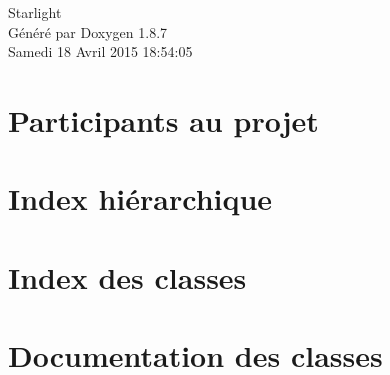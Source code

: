 \documentclass[twoside]{book}
\newcommand{\+}{\discretionary{\mbox{\scriptsize$\hookleftarrow$}}{}{}}
\newcommand{\clearemptydoublepage}{%
  \newpage{\pagestyle{empty}\cleardoublepage}%
}
\begin{document}
\hypersetup{pageanchor=false,
             bookmarks=true,
             bookmarksnumbered=true,
             pdfencoding=unicode
            }
\begin{titlepage}
\vspace*{7cm}
\begin{center}%
{\Large Starlight }\\
\vspace*{1cm}
{\large Généré par Doxygen 1.8.7}\\
\vspace*{0.5cm}
{\small Samedi 18 Avril 2015 18:54:05}\\
\end{center}
\end{titlepage}
\clearemptydoublepage
\tableofcontents
\clearemptydoublepage
{}
\hypersetup{pageanchor=true}

\chapter{Participants au projet}
\label{d0/d30/md_README}
\hypertarget{d0/d30/md_README}{}

\chapter{Index hiérarchique}

\chapter{Index des classes}

\chapter{Documentation des classes}













































\newpage
{}
{}
\printindex
\end{document}
